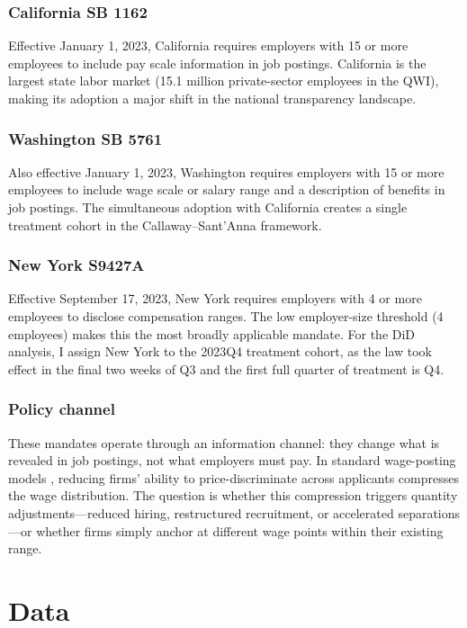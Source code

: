 \documentclass[12pt]{article}
\begin{document}
\subsubsection*{California SB 1162} Effective January 1, 2023, California requires employers with 15 or more employees to include pay scale information in job postings. California is the largest state labor market (15.1 million private-sector employees in the QWI), making its adoption a major shift in the national transparency landscape.

\subsubsection*{Washington SB 5761} Also effective January 1, 2023, Washington requires employers with 15 or more employees to include wage scale or salary range and a description of benefits in job postings. The simultaneous adoption with California creates a single treatment cohort in the Callaway--Sant'Anna framework.

\subsubsection*{New York S9427A} Effective September 17, 2023, New York requires employers with 4 or more employees to disclose compensation ranges. The low employer-size threshold (4 employees) makes this the most broadly applicable mandate. For the DiD analysis, I assign New York to the 2023Q4 treatment cohort, as the law took effect in the final two weeks of Q3 and the first full quarter of treatment is Q4.

\subsubsection*{Policy channel} These mandates operate through an information channel: they change what is revealed in job postings, not what employers must pay. In standard wage-posting models \citep{burdett1998wage, menzio2010block}, reducing firms' ability to price-discriminate across applicants compresses the wage distribution. The question is whether this compression triggers quantity adjustments---reduced hiring, restructured recruitment, or accelerated separations---or whether firms simply anchor at different wage points within their existing range.


\section{Data}
\end{document}

